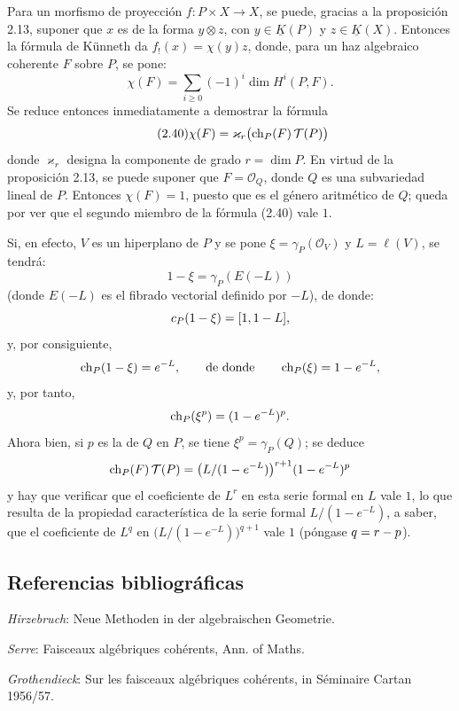 Para un morfismo de proyección \(f:P\times X\longrightarrow X\), se puede, gracias a la proposición 2.13, suponer que \(x\) es de la forma \(y\otimes z\), con \(y\in\underline K(P)\) y \(z\in\underline K(X)\). Entonces la fórmula de Künneth da \(f_!(x)=\chi(y)z\), donde, para un haz algebraico coherente \(F\) sobre \(P\), se pone:
\[
  \chi(F)=\sum_{i\geq 0}(-1)^i\dim H^i(P,F).
\]
Se reduce entonces inmediatamente a demostrar la fórmula
\begin{equation}\tag{2.40}
  \chi(F)=\varkappa_r\bigl(\sisi{\ch_p}{\ch_P}(F)\,\mathcal T(P)\bigr)
\end{equation}
donde \(\varkappa_r\) designa la componente de grado \(r=\dim P\). En virtud de la proposición 2.13, se puede suponer que \(F=\mathcal O_Q\), donde \(Q\) es una subvariedad lineal de \(P\). Entonces \(\chi(F)=1\), puesto que es el género aritmético de \(Q\); queda por ver que el segundo miembro de la fórmula (2.40) vale \(1\).

Si, en efecto, \(V\) es un hiperplano de \(P\) y se pone \(\xi=\gamma_P(\mathcal O_V)\) y \(L=\ell(V)\), se tendrá:
\[
  1-\xi=\gamma_P(E(-L))
\]
(donde \(E(-L)\) es el fibrado vectorial definido por \(-L\)), de donde:
\[
  \sisi{c_p}{c_P}(1-\xi)=[1,1-L],
\]
y, por consiguiente,
\[
  \sisi{\ch_p}{\ch_P}(1-\xi)=e^{-L},\qquad\text{de donde}\qquad \sisi{\ch_p}{\ch_P}(\xi)=1-e^{-L},
\]
y, por tanto,
\[
  \sisi{\ch_p}{\ch_P}(\xi^p)=(1-e^{-L})^p.
\]
Ahora bien, si \(p\) es la  de \(Q\) en \(P\), se tiene \(\xi^p=\gamma_P(Q)\); se deduce
\[
  \sisi{\ch_p}{\ch_P}(F)\,\mathcal T(P)
  =
  \bigl(L/(1-e^{-L})\bigr)^{r+1}(1-e^{-L})^p
\]
y hay que verificar que el coeficiente de \(L^r\) en esta serie formal en \(L\) vale \(1\), lo que resulta de la propiedad característica de la serie formal \(L/(1-e^{-L})\), a saber, que el coeficiente de \(L^q\) en \(\bigl(L/(1-e^{-L})\bigr)^{q+1}\) vale \(1\) (póngase \(\sisi{q=r+1-p}{q=r-p}\)).

\subsection*{Referencias bibliográficas}
\begin{enumerate}[label={[\arabic*]}]
\item \emph{Hirzebruch}: Neue  Methoden in der algebraischen Geometrie.
\item \emph{Serre}: Faisceaux algébriques cohérents, Ann. of Maths.
\item \emph{Grothendieck}: Sur les faisceaux algébriques cohérents, in Séminaire Cartan 1956/57.
\end{enumerate}

